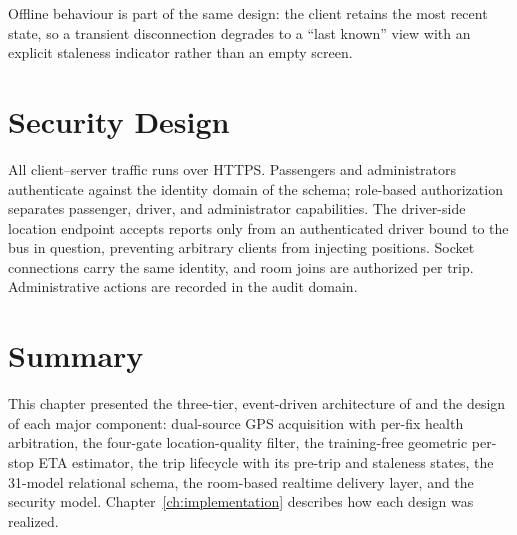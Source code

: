Offline behaviour is part of the same design: the client retains the most
recent state, so a transient disconnection degrades to a ``last known''
view with an explicit staleness indicator rather than an empty screen.

\section{Security Design}
\label{sec:design-security}
All client--server traffic runs over HTTPS. Passengers and administrators
authenticate against the identity domain of the schema; role-based
authorization separates passenger, driver, and administrator
capabilities. The driver-side location endpoint accepts reports only from
an authenticated driver bound to the bus in question, preventing
arbitrary clients from injecting positions. Socket connections carry the
same identity, and room joins are authorized per trip. Administrative
actions are recorded in the audit domain.

\section{Summary}
This chapter presented the three-tier, event-driven architecture of
\system{} and the design of each major component: dual-source GPS
acquisition with per-fix health arbitration, the four-gate
location-quality filter, the training-free geometric per-stop ETA
estimator, the trip lifecycle with its pre-trip and staleness states,
the 31-model relational schema, the room-based realtime delivery layer,
and the security model. Chapter~\ref{ch:implementation} describes how
each design was realized.
